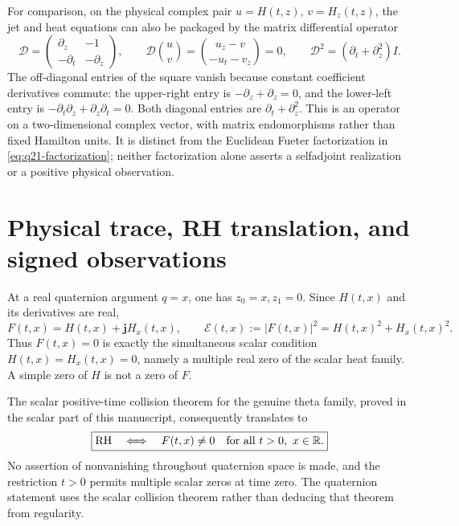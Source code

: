 \documentclass[11pt]{article}
\numberwithin{equation}{section}
\theoremstyle{definition}
\theoremstyle{remark}
\begin{document}
For comparison, on the physical complex pair \(u=H(t,z)\),
\(v=H_z(t,z)\), the jet and heat equations can also be packaged by
the matrix differential operator
\begin{equation}
 \mathcal D=
 \begin{pmatrix}\partial_z&-1\\-\partial_t&-\partial_z\end{pmatrix},
 \qquad
 \mathcal D\binom uv
 =\binom{u_z-v}{-u_t-v_z}=0,
 \qquad
 \mathcal D^2=(\partial_t+\partial_z^2)I.
 \label{eq:q21-complex-pair-square}
\end{equation}
The off-diagonal entries of the square vanish because constant
coefficient derivatives commute: the upper-right entry is
\(-\partial_z+\partial_z=0\), and the lower-left entry is
\(-\partial_t\partial_z+\partial_z\partial_t=0\).
Both diagonal entries are \(\partial_t+\partial_z^2\).
This is an operator on a two-dimensional complex vector, with matrix
endomorphisms rather than fixed Hamilton units. It is distinct from
the Euclidean Fueter factorization in \eqref{eq:q21-factorization};
neither factorization alone asserts a selfadjoint realization or a
positive physical observation.

\section{Physical trace, RH translation, and signed observations}
\label{sec:q21-physical-observations}

At a real quaternion argument \(q=x\), one has \(z_0=x,z_1=0\).
Since \(H(t,x)\) and its derivatives are real,
\begin{equation}
 F(t,x)=H(t,x)+\mathbf jH_x(t,x),\qquad
 \mathcal E(t,x):=|F(t,x)|^2=H(t,x)^2+H_x(t,x)^2.
 \label{eq:q21-physical-trace}
\end{equation}
Thus \(F(t,x)=0\) is exactly the simultaneous scalar condition
\(H(t,x)=H_x(t,x)=0\), namely a multiple real zero of the scalar
heat family. A simple zero of \(H\) is not a zero of \(F\).

The scalar positive-time collision theorem for the genuine theta family,
proved in the scalar part of this manuscript, consequently translates to
\begin{equation}
 \boxed{\mathrm{RH}\quad\Longleftrightarrow\quad
 F(t,x)\ne0\quad\hbox{for all }t>0,\ x\in\mathbb R.}
 \label{eq:q21-rh-real-quaternion}
\end{equation}
No assertion of nonvanishing throughout quaternion space is made, and
the restriction \(t>0\) permits multiple scalar zeros at time zero.
The quaternion statement uses the scalar collision theorem rather than
deducing that theorem from regularity.
\end{document}
